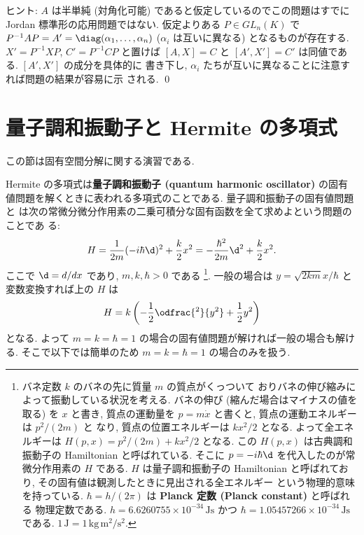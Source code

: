 \documentclass[12pt,twoside]{jarticle}
\begin{document}
\noindent
ヒント: $A$ は半単純 (対角化可能) であると仮定しているのでこの問題はすでに 
Jordan 標準形の応用問題ではない.  仮定よりある $P\in GL_n(K)$ 
で $P^{-1}AP=A'=\diag(\alpha_1,\dots,\alpha_n)$ ($\alpha_i$ は互いに異なる) 
となるものが存在する.  $X'=P^{-1}XP$, $C'=P^{-1}CP$ と置けば $[A,X]=C$ 
と $[A',X']=C'$ は同値である.  $[A',X']$ の成分を具体的に
書き下し, $\alpha_i$ たちが互いに異なることに注意すれば問題の結果が容易に示
される.
\qed


\section{量子調和振動子と Hermite の多項式}
\label{sec:Hermite-polynomials}

この節は固有空間分解に関する演習である.

Hermite の多項式は{\bf 量子調和振動子 (quantum harmonic oscillator)} の固有
値問題を解くときに表われる多項式のことである.  量子調和振動子の固有値問題と
は次の常微分微分作用素の二乗可積分な固有函数を全て求めよという問題のことであ
る:
\begin{equation*}
  H = \frac{1}{2m} (-i\hbar \d)^2 + \frac{k}{2} x^2
  = -\frac{\hbar^2}{2m}\d^2 + \frac{k}{2}x^2.
\end{equation*}
ここで $\d = d/dx$ であり, $m,k,\hbar > 0$ である%
\footnote{バネ定数 $k$ のバネの先に質量 $m$ の質点がくっついて
  おりバネの伸び縮みによって振動している状況を考える.
  バネの伸び (縮んだ場合はマイナスの値を取る) を $x$ と書き, 
  質点の運動量を $p=m\dot x$ と書くと, 質点の運動エネルギーは $p^2/(2m)$ と
  なり, 質点の位置エネルギーは $kx^2/2$ となる.  
  よって全エネルギーは $H(p,x) = p^2/(2m) + kx^2/2$ となる.
  この $H(p,x)$ は古典調和振動子の Hamiltonian と呼ばれている.
  そこに $p=-i\hbar\d$ を代入したのが常微分作用素の $H$ である.
  $H$ は量子調和振動子の Hamiltonian と呼ばれており, 
  その固有値は観測したときに見出される全エネルギー
  という物理的意味を持っている. 
  $\hbar=h/(2\pi)$ は {\bf Planck 定数 (Planck constant)} と呼ばれる
  物理定数である.  $h = 6.6260755\times10^{-34}\,\mathrm{Js}$ 
  かつ $\hbar = 1.05457266\times10^{-34}\,\mathrm{Js}$ である.
  $1\,\mathrm{J} = 1\,\mathrm{kg\,m^2/s^2}$.}.
一般の場合は $y = \sqrt{2km}x/\hbar$ と
変数変換すれば上の $H$ は
\begin{equation*}
  H = k \left( -\frac{1}{2}\odfrac{^2}{y^2} + \frac{1}{2}y^2 \right)
\end{equation*}
となる.  よって $m=k=\hbar=1$ の場合の固有値問題が解ければ一般の場合も解ける.
そこで以下では簡単のため $m=k=\hbar=1$ の場合のみを扱う.  
\end{document}
